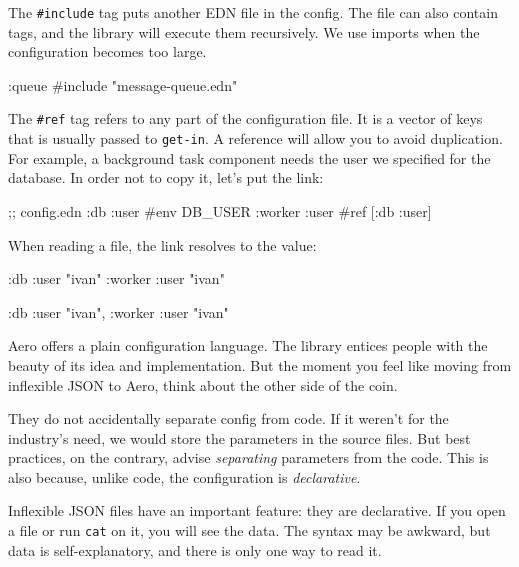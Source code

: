 \fi

The \verb|#include| tag puts another EDN file in the config. The file can also contain tags, and the library will execute them recursively. We use imports when the configuration becomes too large.

\begin{clojure}
{:queue #include "message-queue.edn"}
\end{clojure}

The \verb|#ref| tag refers to any part of the configuration file. It is a vector of keys that is usually passed to \verb|get-in|. A reference will allow you to avoid duplication. For example, a background task component needs the user we specified for the database. In order not to copy it, let's put the link:

\begin{clojure}
;; config.edn
{:db {:user #env DB_USER}
 :worker {:user #ref [:db :user]}}
\end{clojure}

\noindent
When reading a file, the link resolves to the value:

\ifnarrow

\begin{clojure}
{:db {:user "ivan"}
 :worker {:user "ivan"}}
\end{clojure}

\else

\begin{clojure}
{:db {:user "ivan"}, :worker {:user "ivan"}}
\end{clojure}

\fi

Aero offers a plain configuration language. The library entices people with the beauty of its idea and implementation. But the moment you feel like moving from inflexible JSON to Aero, think about the other side of the coin.


They do not accidentally separate config from code. If it weren't for the industry's need, we would store the parameters in the source files. But best practices, on the contrary, advise \emph{separating} parameters from the code. This is also because, unlike code, the configuration is \emph{declarative}.

Inflexible JSON files have an important feature: they are declarative. If you open a file or run \verb|cat| on it, you will see the data. The syntax may be awkward, but data is self-explanatory, and there is only one way to read it.

